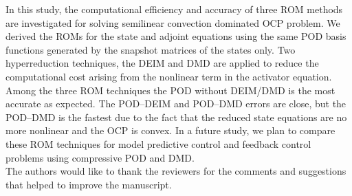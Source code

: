 \documentclass[preprint,12pt]{elsarticle}
\begin{document}
In this study, the computational efficiency and accuracy of three ROM methods are investigated for solving semilinear convection dominated OCP problem. We derived the ROMs for the state and adjoint equations using the same POD basis functions generated by the snapshot matrices of the states only. Two hyperreduction techniques, the DEIM and DMD are applied to reduce the computational cost arising from the nonlinear term in the activator equation. Among the three ROM techniques the POD without DEIM/DMD is the most accurate as expected. The POD--DEIM and POD--DMD errors are close, but the POD--DMD is the fastest due to the fact that the reduced state equations are no more nonlinear and the OCP is convex. In a future study, we plan to compare these ROM techniques for model predictive control and feedback control problems using compressive POD and DMD.\\

The authors would like to thank the reviewers for the comments and suggestions that
helped to  improve the manuscript.

%
%
\end{document}

